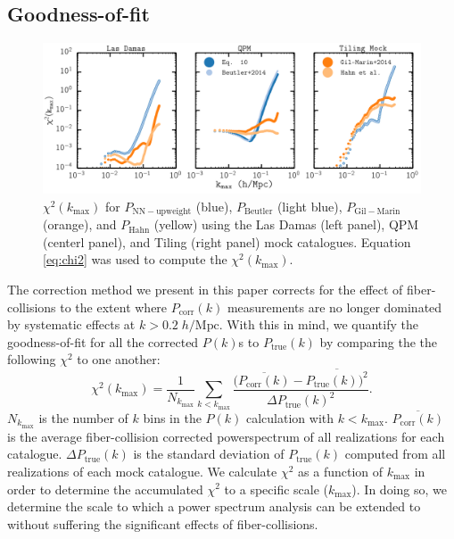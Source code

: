 \documentclass{emulateapj}
\begin{document}
\subsection{Goodness-of-fit} \label{sec:litcomp}
\begin{figure} 
\begin{center}
\includegraphics[scale=0.55]{fcpaper_pk_chisquared_comparison.png} 
\caption{$\chi^2 (k_\mathrm{max})$ for $P_\mathrm{NN-upweight}$ (blue), $P_\mathrm{Beutler}$ (light blue), $P_\mathrm{Gil-Marin}$ (orange), and $P_\mathrm{Hahn}$ (yellow) using the Las Damas (left panel), QPM (centerl panel), and Tiling (right panel) mock catalogues. Equation \ref{eq:chi2} was used to compute the $\chi^2(k_\mathrm{max})$. }\label{fig:peaksnchi2}
\end{center}
\end{figure}

The correction method we present in this paper corrects for the effect of fiber-collisions to the extent where $P_\mathrm{corr}(k)$ measurements are no longer dominated by systematic effects at $k > 0.2 \; h/\mathrm{Mpc}$. With this in mind, we quantify the goodness-of-fit for all the corrected $P(k)$s to $P_\mathrm{true}(k)$ by comparing the the following $\chi^2$ to one another: 
\begin{equation}
\chi^2 (k_\mathrm{max}) = \frac{1}{N_{k_\mathrm{max}}} \sum\limits_{k< k_\mathrm{max}} \frac{(\overline{P_\mathrm{corr}(k)} - \overline{P_\mathrm{true}(k))^2}}{\Delta P_\mathrm{true} (k)^2}. \label{eq:chi2}
\end{equation}
$N_{k_\mathrm{max}}$ is the number of $k$ bins in the $P(k)$ calculation with $k < k_\mathrm{max}$. $\overline{P_\mathrm{corr}(k)}$ is the average fiber-collision corrected powerspectrum of all realizations for each catalogue. $\Delta P_\mathrm{true}(k)$ is the standard deviation of $P_\mathrm{true}(k)$ computed from all realizations of each mock catalogue. We calculate $\chi^2$ as a function of $k_\mathrm{max}$ in order to determine the accumulated $\chi^2$ to a specific scale ($k_\mathrm{max}$). In doing so, we determine the scale to which a power spectrum analysis can be extended to without suffering the significant effects of fiber-collisions. 
\end{document}

